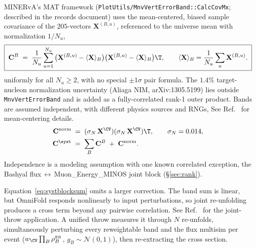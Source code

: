 MINERvA's MAT framework (\texttt{PlotUtils/\allowbreak MnvVertErrorBand::\allowbreak CalcCovMx}; described in the records document) uses the mean-centered, biased sample covariance of the $205$-vectors $\mathbf{X}^{(B,u)}$, referenced to the universe mean with normalization $1/N_{u}$,
\begin{equation}
\boxed{\;
\mathbf{C}^{B}
\;=\;
\frac{1}{N_{u}}\sum_{u=1}^{N_{u}}
\big(\mathbf{X}^{(B,u)} - \langle\mathbf{X}\rangle_{B}\big)
\big(\mathbf{X}^{(B,u)} - \langle\mathbf{X}\rangle_{B}\big)\T,
\qquad
\langle\mathbf{X}\rangle_{B} = \frac{1}{N_{u}}\sum_{u}\mathbf{X}^{(B,u)}.
\;}
\label{eq:matcov}
\end{equation}
uniformly for all $N_{u}\ge 2$, with no special $\pm1\sigma$ pair formula. The $1.4\%$ target-nucleon normalization uncertainty (Aliaga NIM, arXiv:1305.5199) lies outside \texttt{MnvVertErrorBand} and is added as a fully-correlated rank-1 outer product. Bands are assumed independent, with different physics sources and RNGs, See Ref.~\cite{NoteRecords2026} for mean-centering details.
\begin{align}
\mathbf{C}^{\text{norm}} \;&=\; (\sigma_{N}\,\mathbf{X}^{\CV})(\sigma_{N}\,\mathbf{X}^{\CV})\T,
\qquad \sigma_{N} = 0.014,
\label{eq:normband}
\\
\mathbf{C}^{\syst}
\;&=\;
\sum_{B}\mathbf{C}^{B}\;+\;\mathbf{C}^{\text{norm}}.
\label{eq:systblocksum}
\end{align}
Independence is a modeling assumption with one known correlated exception, the Bashyal flux\,$\leftrightarrow$\,Muon\_Energy\_MINOS joint block (\S\ref{sec:rank}).

Equation~\eqref{eq:systblocksum} omits a larger correction. The band sum is linear, but OmniFold responds nonlinearly to input perturbations, so joint re-unfolding produces a cross term beyond any pairwise correlation. See Ref.~\cite{NoteRecords2026} for the joint-throw application. A unified throw measures it through $N$ re-unfolds, simultaneously perturbing every reweightable band and the flux multisim per event ($w_{\CV}\prod_B\rho_B^{g_B}$, $g_B\sim\mathcal N(0,1)$), then re-extracting the cross section.

